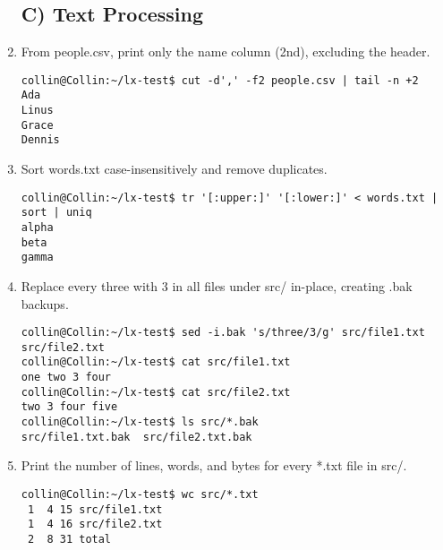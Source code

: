 \begin{enumerate}
\subsection*{C) Text Processing}
    \item From people.csv, print only the name column (2nd), excluding the header.
    \begin{verbatim}
collin@Collin:~/lx-test$ cut -d',' -f2 people.csv | tail -n +2
Ada
Linus
Grace
Dennis
    \end{verbatim}
    \item Sort words.txt case-insensitively and remove duplicates.
\begin{verbatim}
collin@Collin:~/lx-test$ tr '[:upper:]' '[:lower:]' < words.txt | sort | uniq
alpha
beta
gamma
\end{verbatim}
    \item Replace every three with 3 in all files under src/ in-place, creating .bak backups.
\begin{verbatim}
collin@Collin:~/lx-test$ sed -i.bak 's/three/3/g' src/file1.txt src/file2.txt
collin@Collin:~/lx-test$ cat src/file1.txt
one two 3 four
collin@Collin:~/lx-test$ cat src/file2.txt
two 3 four five
collin@Collin:~/lx-test$ ls src/*.bak
src/file1.txt.bak  src/file2.txt.bak 
\end{verbatim}
    \item Print the number of lines, words, and bytes for every *.txt file in src/.
\begin{verbatim}
collin@Collin:~/lx-test$ wc src/*.txt
 1  4 15 src/file1.txt
 1  4 16 src/file2.txt
 2  8 31 total
\end{verbatim}


\end{enumerate}
